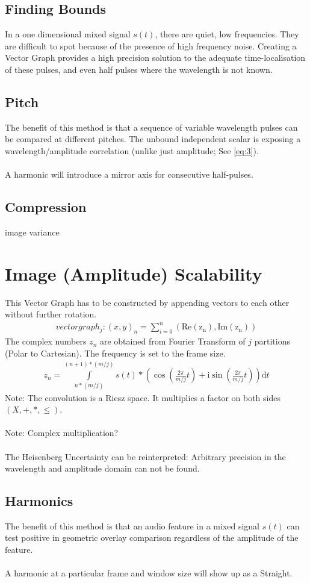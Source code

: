 \documentclass{report}
\begin{document}
\subsection{Finding Bounds}
In a one dimensional mixed signal $s(t)$, there are quiet, low frequencies. They are difficult to spot because of the presence of high frequency noise. Creating a Vector Graph provides a high precision solution to the adequate time-localisation of these pulses, and even half pulses where the wavelength is not known.
\subsection{Pitch}
The benefit of this method is that a sequence of variable wavelength pulses can be compared at different pitches. The unbound independent scalar is exposing a wavelength/amplitude correlation (unlike just amplitude; See \eqref{eq:3}).\\\\
A harmonic will introduce a mirror axis for consecutive half-pulses.
\subsection{Compression}
image variance
\section{Image (Amplitude) Scalability}
This Vector Graph has to be constructed by appending vectors to each other without further rotation.
\begin{align}
vectorgraph_{j}: (x,y)_{n}=\sum \limits _{i=0}^{n}(\mathrm{Re(z_{n})},\mathrm{Im(z_{n})})
\end{align}
The complex numbers $z_{n}$ are obtained from Fourier Transform of $j$ partitions (Polar to Cartesian). The frequency is set to the frame size.
\begin{align}
z_{n}= \int \limits _{n*(m/j)}^{(n+1)*(m/j)} s(t)*(\cos(\frac{2\pi}{m/j}t)+\mathrm{i}\sin(\frac{2\pi}{m/j}t))\mathrm{d}t\label{eq:3}
\end{align}
Note: The convolution is a Riesz space. It multiplies a factor on both sides $(X,+,*,\leq)$.\\\\
Note: Complex multiplication?\\\\
The Heisenberg Uncertainty can be reinterpreted: Arbitrary precision in the wavelength and amplitude domain can not be found.
\subsection{Harmonics}
The benefit of this method is that an audio feature in a mixed signal $s(t)$ can test positive in geometric overlay comparison regardless of the amplitude of the feature.\\\\
A harmonic at a particular frame and window size will show up as a Straight.
\end{document}
